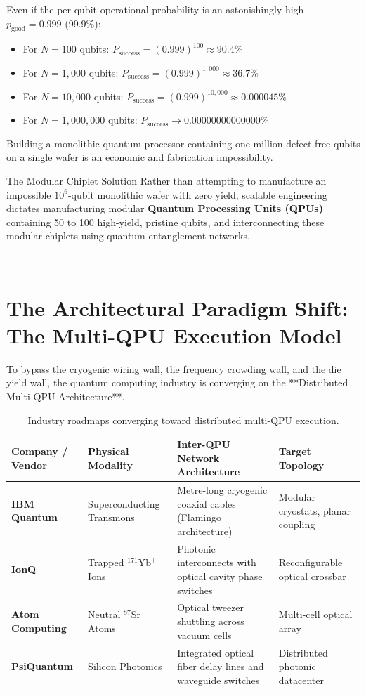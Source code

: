 Even if the per-qubit operational probability is an astonishingly high $p_{\text{good}} = 0.999$ (99.9\%):
\begin{itemize}
    \item For $N = 100$ qubits: $P_{\text{success}} = (0.999)^{100} \approx 90.4\%$
    \item For $N = 1,000$ qubits: $P_{\text{success}} = (0.999)^{1,000} \approx 36.7\%$
    \item For $N = 10,000$ qubits: $P_{\text{success}} = (0.999)^{10,000} \approx 0.000045\%$
    \item For $N = 1,000,000$ qubits: $P_{\text{success}} \to 0.00000000000000\%$
\end{itemize}

Building a monolithic quantum processor containing one million defect-free qubits on a single wafer is an economic and fabrication impossibility. 

\begin{definitionbox}{The Modular Chiplet Solution}
Rather than attempting to manufacture an impossible $10^6$-qubit monolithic wafer with zero yield, scalable engineering dictates manufacturing modular \textbf{Quantum Processing Units (QPUs)} containing 50 to 100 high-yield, pristine qubits, and interconnecting these modular chiplets using quantum entanglement networks.
\end{definitionbox}

---

\section{The Architectural Paradigm Shift: The Multi-QPU Execution Model}

To bypass the cryogenic wiring wall, the frequency crowding wall, and the die yield wall, the quantum computing industry is converging on the **Distributed Multi-QPU Architecture**.

\begin{table}[htbp]
\centering
\small
\begin{tabularx}{\textwidth}{l X X X}
\toprule
\textbf{Company / Vendor} & \textbf{Physical Modality} & \textbf{Inter-QPU Network Architecture} & \textbf{Target Topology} \\
\midrule
\textbf{IBM Quantum} & Superconducting Transmons & Metre-long cryogenic coaxial cables (Flamingo architecture) & Modular cryostats, planar coupling \\
\addlinespace
\textbf{IonQ} & Trapped $^{171}\text{Yb}^+$ Ions & Photonic interconnects with optical cavity phase switches & Reconfigurable optical crossbar \\
\addlinespace
\textbf{Atom Computing} & Neutral $^{87}\text{Sr}$ Atoms & Optical tweezer shuttling across vacuum cells & Multi-cell optical array \\
\addlinespace
\textbf{PsiQuantum} & Silicon Photonics & Integrated optical fiber delay lines and waveguide switches & Distributed photonic datacenter \\
\bottomrule
\end{tabularx}
\caption{Industry roadmaps converging toward distributed multi-QPU execution.}
\label{tab:industry_roadmaps}
\end{table}

